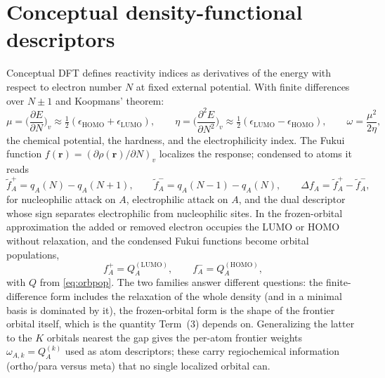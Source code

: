 \documentclass[11pt,a4paper]{article}
\newcommand{\vb}[1]{\bm{#1}}
\begin{document}
\section{Conceptual density-functional descriptors}
\label{sec:cdft}
Conceptual DFT \cite{parryang} defines reactivity indices as derivatives of the energy with respect to electron number $N$ at fixed external potential. With finite differences over $N\pm1$ and Koopmans' theorem:
\begin{equation}
\mu=\Big(\frac{\partial E}{\partial N}\Big)_v\approx\tfrac12(\epsilon_{\mathrm{HOMO}}+\epsilon_{\mathrm{LUMO}}),\qquad
\eta=\Big(\frac{\partial^2E}{\partial N^2}\Big)_v\approx\tfrac12(\epsilon_{\mathrm{LUMO}}-\epsilon_{\mathrm{HOMO}}),\qquad
\omega=\frac{\mu^2}{2\eta},
\end{equation}
the chemical potential, the hardness, and the electrophilicity index. The Fukui function $f(\vb{r})=(\partial\rho(\vb{r})/\partial N)_v$ localizes the response; condensed to atoms \cite{yangmortier} it reads
\begin{equation}
\tilde f^{+}_A=q_A(N)-q_A(N{+}1),\qquad \tilde f^{-}_A=q_A(N{-}1)-q_A(N),\qquad \Delta f_A=\tilde f^+_A-\tilde f^-_A,
\end{equation}
for nucleophilic attack on $A$, electrophilic attack on $A$, and the dual descriptor \cite{morell} whose sign separates electrophilic from nucleophilic sites. In the frozen-orbital approximation the added or removed electron occupies the LUMO or HOMO without relaxation, and the condensed Fukui functions become orbital populations,
\begin{equation}
f^{+}_A=Q^{(\mathrm{LUMO})}_A,\qquad f^{-}_A=Q^{(\mathrm{HOMO})}_A,
\end{equation}
with $Q$ from \eqref{eq:orbpop}. The two families answer different questions: the finite-difference form includes the relaxation of the whole density (and in a minimal basis is dominated by it), the frozen-orbital form is the shape of the frontier orbital itself, which is the quantity Term~(3) depends on. Generalizing the latter to the $K$ orbitals nearest the gap gives the per-atom frontier weights $\omega_{A,k}=Q^{(k)}_A$ used as atom descriptors; these carry regiochemical information (ortho/para versus meta) that no single localized orbital can.
\end{document}
